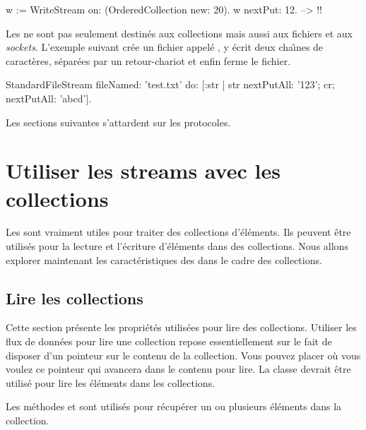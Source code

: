 \documentclass[a4paper,10pt,twoside]{book}
\begin{document}
\begin{code}{}
w := WriteStream on: (OrderedCollection new: 20).
w nextPut: 12. -->  !!
\end{code}

Les \streams ne sont pas seulement destin\'es aux collections mais
aussi aux fichiers et aux \emph{sockets}.
L'exemple suivant cr\'ee un fichier appel\'e , 
y \'ecrit deux cha\^{\i}nes de caract\`eres, s\'epar\'ees par un retour-chariot et enfin ferme le fichier.

\begin{code}{}
StandardFileStream
  fileNamed: 'test.txt'
  do: [:str | str
                nextPutAll: '123';
                cr;
                nextPutAll: 'abcd'].
\end{code}

Les sections suivantes s'attardent sur les protocoles.

\section{Utiliser les streams avec les collections}

Les \streams sont vraiment utiles pour traiter des collections d'\'el\'ements.
Ils peuvent \^etre utilis\'es pour la lecture et l'\'ecriture d'\'el\'ements
dans des collections. Nous allons explorer maintenant les caract\'eristiques
des \streams dans le cadre des collections.

\subsection{Lire les collections}

Cette section pr\'esente les propri\'et\'es utilis\'ees pour lire des collections. Utiliser les flux de donn\'ees pour lire une collection 
repose essentiellement sur le fait de disposer d'un pointeur sur le contenu de la collection.
Vous pouvez placer o\`u vous voulez ce pointeur qui avancera dans le contenu pour lire.
La classe  devrait \^etre utilis\'e pour lire les \'el\'ements dans les collections.

Les m\'ethodes  et  
sont utilis\'es pour r\'ecup\'erer un ou plusieurs \'el\'ements dans
la collection.
\end{document}
